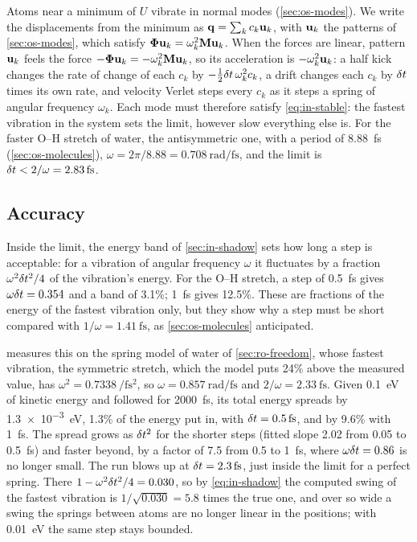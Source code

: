 Atoms near a minimum of $U$ vibrate in normal modes (\cref{sec:os-modes}).
We write the displacements from the minimum as $\bm{\mathrm{q}} = \sum_k
c_k\bm{\mathrm{u}}_k$, with $\bm{\mathrm{u}}_k$ the patterns of \cref{sec:os-modes}, which
satisfy $\boldsymbol{\Phi}\bm{\mathrm{u}}_k = \omega_k^2\bm{\mathrm{M}}\bm{\mathrm{u}}_k$. When the
forces are linear, pattern $\bm{\mathrm{u}}_k$ feels the force
$-\boldsymbol{\Phi}\bm{\mathrm{u}}_k = -\omega_k^2\bm{\mathrm{M}}\bm{\mathrm{u}}_k$, so its
acceleration is $-\omega_k^2\bm{\mathrm{u}}_k$: a half kick changes the rate of
change of each $c_k$ by $-\frac12\delta t\,\omega_k^2c_k$, a drift changes each
$c_k$ by $\delta t$ times its own rate, and velocity Verlet steps every $c_k$ as
it steps a spring of angular frequency $\omega_k$. Each mode must
therefore satisfy \cref{eq:in-stable}: the fastest vibration in the system
sets the limit, however slow everything else is. For the faster O--H
stretch of water, the antisymmetric one, with a period of
\SI{8.88}{\femto\second} (\cref{sec:os-molecules}), $\omega = 2\pi/8.88 =
\SI{0.708}{\radian\per\femto\second}$, and the limit is $\dt < 2/\omega =
\SI{2.83}{\femto\second}$.

\subsection*{Accuracy}

Inside the limit, the energy band of \cref{sec:in-shadow} sets how long a
step is acceptable: for a vibration of angular frequency $\omega$ it
fluctuates by a fraction $\omega^2\delta t^2/4$ of the vibration's energy. For
the O--H stretch, a step of \SI{0.5}{\femto\second} gives $\omega\delta t =
0.354$ and a band of 3.1\%; \SI{1}{\femto\second} gives 12.5\%. These are
fractions of the energy of the fastest vibration only, but they show why a
step must be short compared with $1/\omega = \SI{1.41}{\femto\second}$, as
\cref{sec:os-molecules} anticipated.

 measures this on the spring model of water of
\cref{sec:ro-freedom}, whose fastest vibration, the symmetric stretch,
which the model puts 24\% above the measured value, has $\omega^2 =
\SI{0.7338}{\per\femto\second\squared}$, so $\omega =
\SI{0.857}{\radian\per\femto\second}$ and $2/\omega =
\SI{2.33}{\femto\second}$. Given \SI{0.1}{\electronvolt} of kinetic
energy and followed for \SI{2000}{\femto\second}, its total energy spreads
by \SI{1.3e-3}{\electronvolt}, 1.3\% of the energy put in, with $\dt =
\SI{0.5}{\femto\second}$, and by 9.6\% with \SI{1}{\femto\second}. The
spread grows as $\delta t^2$ for the shorter steps (fitted slope 2.02 from 0.05
to \SI{0.5}{\femto\second}) and faster beyond, by a factor of 7.5 from 0.5
to \SI{1}{\femto\second}, where $\omega\delta t = 0.86$ is no longer small. The
run blows up at $\dt = \SI{2.3}{\femto\second}$, just inside the limit for
a perfect spring. There $1 - \omega^2\delta t^2/4 = 0.030$, so by
\cref{eq:in-shadow} the computed swing of the fastest vibration is
$1/\sqrt{0.030} = 5.8$ times the true one, and over so wide a swing the
springs between atoms are no longer linear in the positions; with
\SI{0.01}{\electronvolt} the same step stays bounded.

